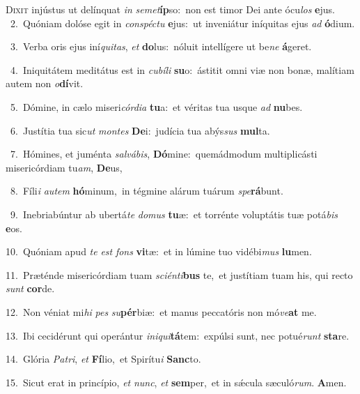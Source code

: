 \lettrine{\initial\textcolor{\initialcolor}{D}}{ixit} injústus ut delínquat \textit{in} \textit{se}\-\textit{met}\textbf{íp}so:~\star non est timor Dei ante ócu\textit{los} \textbf{e}\-jus.\\
{\numbfont\textcolor{\numbcolor}{~2.}}~Quóniam dolóse egit in \textit{con}\-\textit{spéc}\textit{tu} \textbf{e}\-jus:~\star ut inveniátur iníquitas ejus \textit{ad} \textbf{ó}\-dium.\par
{\numbfont\textcolor{\numbcolor}{~3.}}~Verba oris ejus iní\-\textit{qui}\-\textit{tas}, \textit{et} \textbf{do}\-lus:~\star nóluit intellígere ut be\textit{ne} \textbf{á}\-geret.\par
{\numbfont\textcolor{\numbcolor}{~4.}}~Iniquitátem meditátus est in \textit{cu}\-\textit{bí}\textit{li} \textbf{su}\-o:~\star ástitit omni viæ non bonæ, malítiam autem non \textit{o}\-\textbf{dí}vit.\par
{\numbfont\textcolor{\numbcolor}{~5.}}~Dómine, in cælo miseri\-\textit{cór}\-\textit{di}\textit{a} \textbf{tu}\-a:~\star et véritas tua usque \textit{ad} \textbf{nu}\-bes.\par
{\numbfont\textcolor{\numbcolor}{~6.}}~Justítia tua sic\textit{ut} \textit{mon}\-\textit{tes} \textbf{De}\-i:~\star judícia tua abýs\textit{sus} \textbf{mul}\-ta.\par
{\numbfont\textcolor{\numbcolor}{~7.}}~Hómines, et juménta \textit{sal}\-\textit{vá}\textit{bis}, \textbf{Dó}\-mine:~\star quemádmodum multiplicásti misericórdiam tu\-\textit{am}\-, \textbf{De}\-us,\par
{\numbfont\textcolor{\numbcolor}{~8.}}~Fíli\textit{i} \textit{au}\-\textit{tem} \textbf{hó}\-minum,~\star in tégmine alárum tuárum \textit{spe}\-\textbf{rá}bunt.\par
{\numbfont\textcolor{\numbcolor}{~9.}}~Inebriabúntur ab ubertá\textit{te} \textit{do}\-\textit{mus} \textbf{tu}\-æ:~\star et torrénte voluptátis tuæ potá\textit{bis} \textbf{e}\-os.\par
{\numbfont\textcolor{\numbcolor}{10.}}~Quóniam apud \textit{te} \textit{est} \textit{fons} \textbf{vi}\-tæ:~\star et in lúmine tuo vidébi\textit{mus} \textbf{lu}\-men.\par
{\numbfont\textcolor{\numbcolor}{11.}}~Præténde misericórdiam tuam \textit{sci}\-\textit{én}\textit{ti}\textbf{bus} te,~\star et justítiam tuam his, qui recto \textit{sunt} \textbf{cor}\-de.\par
{\numbfont\textcolor{\numbcolor}{12.}}~Non véniat mi\textit{hi} \textit{pes} \textit{su}\-\textbf{pér}biæ:~\star et manus peccatóris non mó\-\textit{ve}\-\textbf{at} me.\par
{\numbfont\textcolor{\numbcolor}{13.}}~Ibi cecidérunt qui operántur \textit{in}\-\textit{i}\textit{qui}\textbf{tá}tem:~\star expúlsi sunt, nec potué\textit{runt} \textbf{sta}\-re.\par
{\numbfont\textcolor{\numbcolor}{14.}}~Glória \textit{Pa}\-\textit{tri}, \textit{et} \textbf{Fí}\-lio,~\star et Spirítu\textit{i} \textbf{Sanc}\-to.\par
{\numbfont\textcolor{\numbcolor}{15.}}~Sicut erat in princípio, \textit{et} \textit{nunc}\-, \textit{et} \textbf{sem}\-per,~\star et in sǽcula sæculó\-\textit{rum}\-. \textbf{A}\-men.\par
